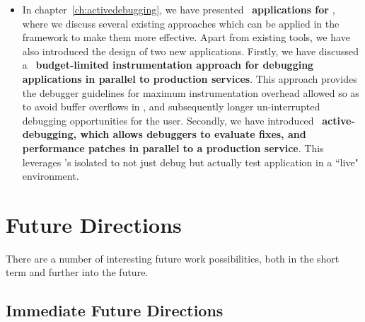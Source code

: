 \begin{itemize}
	\item In chapter~\ref{ch:activedebugging}, we have presented ~\textbf{applications for \livedebugging}, where we discuss several existing approaches which can be applied in the \parikshan framework to make them more effective. 
	Apart from existing tools, we have also introduced the design of two new applications. 
	Firstly, we have discussed a ~\textbf{budget-limited instrumentation approach for debugging applications in parallel to production services}. 
	This approach provides the debugger guidelines for maximum instrumentation overhead allowed so as to avoid buffer overflows in \parikshan, and subsequently longer un-interrupted debugging opportunities for the user.
	Secondly, we have introduced ~\textbf{active-debugging, which allows debuggers to evaluate fixes, and performance patches in parallel to a production service}. This leverages \parikshan's isolated \debugcontainer to not just debug but actually test application in a ``live" environment. 
	 
\end{itemize}

\section{Future Directions}
\label{sec:future}

There are a number of interesting future work possibilities, both in the short term and further into the future.


\subsection{Immediate Future Directions}
\label{sec:immediateFutureWork}

